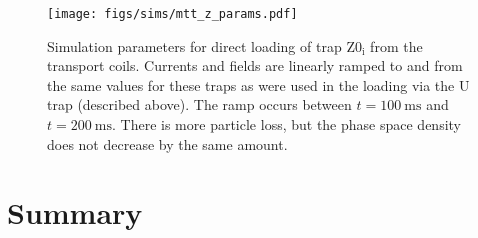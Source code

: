 \begin{figure}[tbh]
\centering
  \texttt{[image: figs/sims/mtt\_z\_params.pdf]}
  \caption{
    Simulation parameters for direct loading of trap $\mathrm{Z0_i}$ from the
    transport coils. Currents and fields are linearly ramped to and from the
    same values for these traps as were used in the loading via the U trap
    (described above). The ramp occurs between $t=\SI{100}{\milli\second}$ and
    $t=\SI{200}{\milli\second}$. There is more particle loss, but the phase
    space density does not decrease by the same amount.
  }
  \label{design:fig:directzramp}
\end{figure}



\section{Summary}

